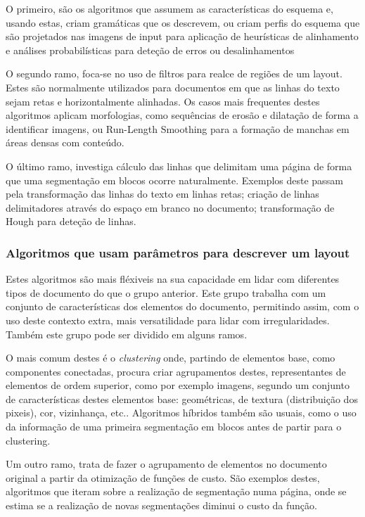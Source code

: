 O primeiro, são os algoritmos que assumem as características do esquema e, usando estas, criam gramáticas que os descrevem, ou criam perfis do esquema que são projetados nas imagens de input para aplicação de heurísticas de alinhamento e análises probabilísticas para deteção de erros ou desalinhamentos

O segundo ramo, foca-se no uso de filtros para realce de regiões de um layout. Estes são normalmente utilizados para documentos em que as linhas do texto sejam retas e horizontalmente alinhadas. Os casos mais frequentes destes algoritmos aplicam morfologias, como sequências de erosão e dilatação de forma a identificar imagens, ou Run-Length Smoothing para a formação de manchas em áreas densas com conteúdo.

O último ramo, investiga cálculo das linhas que delimitam uma página de forma que uma segmentação em blocos  ocorre naturalmente. Exemplos deste passam pela transformação das linhas do texto em linhas retas; criação de linhas delimitadores através do espaço em branco no documento; transformação de Hough para deteção de linhas.

\subsubsection{Algoritmos que usam parâmetros para descrever um layout}

Estes algoritmos são mais fléxiveis na sua capacidade em lidar com diferentes tipos de documento do que o grupo anterior. Este grupo trabalha com um conjunto de características dos elementos do documento, permitindo assim, com o uso deste contexto extra, mais versatilidade para lidar com irregularidades. Também este grupo pode ser dividido em alguns ramos.

O mais comum destes é o \textit{clustering} onde, partindo de elementos base, como componentes conectadas, procura criar agrupamentos destes, representantes de elementos de ordem superior, como por exemplo imagens, segundo um conjunto de características destes elementos base: geométricas, de textura (distribuição dos pixeis), cor, vizinhança, etc.. Algoritmos híbridos também são usuais, como o uso da informação de uma primeira segmentação em blocos antes de partir para o clustering.

Um outro ramo, trata de fazer o agrupamento de elementos no documento original a partir da otimização de funções de custo. São exemplos destes, algoritmos que iteram sobre a realização de segmentação numa página, onde se estima se a realização de novas segmentações diminui o custo da função.

